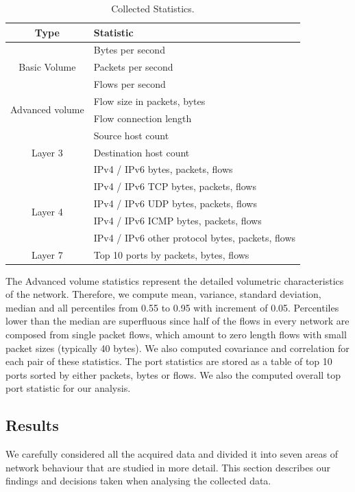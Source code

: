 \begin{table}[!t]
        \centering
        \renewcommand{\arraystretch}{1.1}
        \begin{tabular}{|c|l|} \hline
            \textbf{Type} & \textbf{Statistic} \\ \hline
            \multirow{3}{*}{Basic Volume} & Bytes per second \\
            & Packets per second \\
            & Flows per second \\ \hline
            \multirow{2}{*}{Advanced volume} & Flow size in packets, bytes \\
            & Flow connection length \\ \hline
            \multirow{3}{*}{Layer 3} & Source host count \\
            & Destination host count \\
            & IPv4 / IPv6 bytes, packets, flows \\ \hline
            \multirow{4}{*}{Layer 4} & IPv4 / IPv6 TCP bytes, packets, flows \\
            & IPv4 / IPv6 UDP bytes, packets, flows \\
            & IPv4 / IPv6 ICMP bytes, packets, flows \\
            & IPv4 / IPv6 other protocol bytes, packets, flows \\ \hline
            \multirow{1}{*}{Layer 7} & Top 10 ports by packets, bytes, flows \\
            \hline
        \end{tabular}
        \caption{Collected Statistics.}
        \label{tab:characterization-collected-statistics}
\end{table}

The Advanced volume statistics represent the detailed volumetric characteristics of the network. Therefore, we compute mean, variance, standard deviation, median and all percentiles from 0.55 to 0.95 with increment of 0.05. Percentiles lower than the median are superfluous since half of the flows in every network are composed from single packet flows, which amount to zero length flows with small packet sizes (typically 40 bytes). We also computed covariance and correlation for each pair of these statistics. The port statistics are stored as a table of top 10 ports sorted by either packets, bytes or flows. We also the computed overall top port statistic for our analysis.

\subsection{Results} \label{subsec:characterization-results}
We carefully considered all the acquired data and divided it into seven areas of network behaviour that are studied in more detail. This section describes our findings and decisions taken when analysing the collected data.


